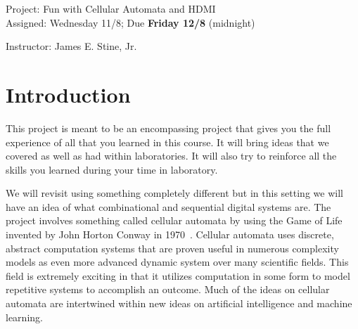 \documentclass{article}
\newcommand{\myassignment}{Project: Fun with Cellular Automata and HDMI}
\newcommand{\myduedate}{Assigned: Wednesday 11/8; Due \textbf{Friday 12/8} (midnight)}
\newcommand{\myinstructor}{Instructor: James E. Stine, Jr.}
\begin{document}
\begin{center}
  {\huge \myassignment} \\
  {\large \myduedate} \\
  \begin{flushright}
  \myinstructor \\
  \end{flushright}
\end{center}

\section{Introduction}

This project is meant to be an encompassing project that gives you the
full experience of all that you learned in this course.  It will bring
ideas that we covered as well as had within laboratories.  It will
also try to reinforce all the skills you learned during your time in
laboratory.

We will revisit using something completely different but in this setting we
will have an idea of what combinational and sequential digital systems
are.
The project involves something called cellular automata by using the Game of Life invented by
John Horton Conway in 1970~\cite{games1970fantastic}. Cellular automata uses discrete, abstract computation systems
that are proven useful in numerous complexity models as even more advanced dynamic system
over many scientific fields. This field is extremely exciting in that it utilizes computation in
some form to model repetitive systems to accomplish an outcome.  Much
of the ideas on cellular automata are intertwined within new ideas on
artificial intelligence and machine learning.
\end{document}
